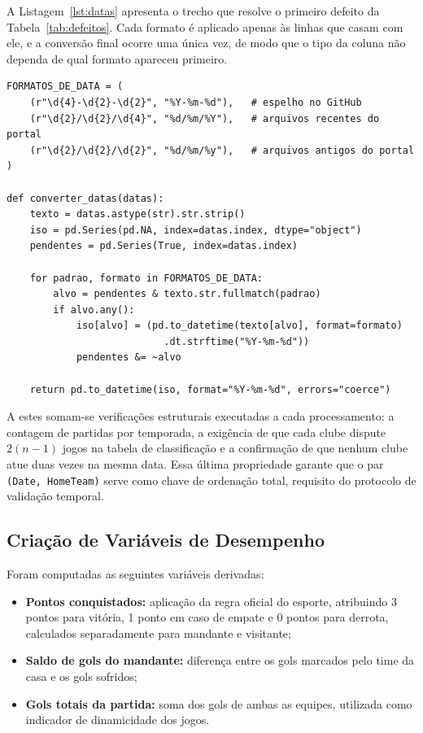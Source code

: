 A Listagem~\ref{lst:datas} apresenta o trecho que resolve o primeiro defeito da
Tabela~\ref{tab:defeitos}. Cada formato é aplicado apenas às linhas que casam
com ele, e a conversão final ocorre uma única vez, de modo que o tipo da coluna
não dependa de qual formato apareceu primeiro.

\begin{sourcecode}[htb]
  \caption{Conversão de datas em \texttt{src/tcc/preparacao.py}.}
  \label{lst:datas}
\begin{lstlisting}
FORMATOS_DE_DATA = (
    (r"\d{4}-\d{2}-\d{2}", "%Y-%m-%d"),   # espelho no GitHub
    (r"\d{2}/\d{2}/\d{4}", "%d/%m/%Y"),   # arquivos recentes do portal
    (r"\d{2}/\d{2}/\d{2}", "%d/%m/%y"),   # arquivos antigos do portal
)

def converter_datas(datas):
    texto = datas.astype(str).str.strip()
    iso = pd.Series(pd.NA, index=datas.index, dtype="object")
    pendentes = pd.Series(True, index=datas.index)

    for padrao, formato in FORMATOS_DE_DATA:
        alvo = pendentes & texto.str.fullmatch(padrao)
        if alvo.any():
            iso[alvo] = (pd.to_datetime(texto[alvo], format=formato)
                           .dt.strftime("%Y-%m-%d"))
            pendentes &= ~alvo

    return pd.to_datetime(iso, format="%Y-%m-%d", errors="coerce")
\end{lstlisting}
\end{sourcecode}

A estes somam-se verificações estruturais executadas a cada processamento: a
contagem de partidas por temporada, a exigência de que cada clube dispute
$2(n-1)$ jogos na tabela de classificação e a confirmação de que nenhum clube
atue duas vezes na mesma data. Essa última propriedade garante que o par
\texttt{(Date, HomeTeam)} serve como chave de ordenação total, requisito do
protocolo de validação temporal.

\subsection{Criação de Variáveis de Desempenho}\label{sec:variaveis}

Foram computadas as seguintes variáveis derivadas:

\begin{itemize}
  \item \textbf{Pontos conquistados:} aplicação da regra oficial do esporte,
    atribuindo 3 pontos para vitória, 1 ponto em caso de empate e 0 pontos para
    derrota, calculados separadamente para mandante e visitante;
  \item \textbf{Saldo de gols do mandante:} diferença entre os gols marcados
    pelo time da casa e os gols sofridos;
  \item \textbf{Gols totais da partida:} soma dos gols de ambas as equipes,
    utilizada como indicador de dinamicidade dos jogos.
\end{itemize}

